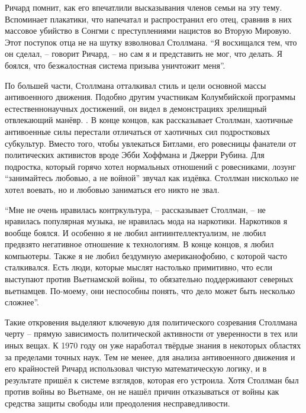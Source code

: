 Ричард помнит, как его впечатлили высказывания членов семьи на эту тему. Вспоминает плакатики, что напечатал и распространил его отец, сравнив в них массовое убийство в Сонгми с преступлениями нацистов во Вторую Мировую. Этот поступок отца не на шутку взволновал Столлмана. \enquote{Я восхищался тем, что он сделал, -- говорит Ричард, -- но сам я и представить не мог, что делать. Я боялся, что безжалостная система призыва уничтожит меня}.

По большей части, Столлмана отталкивал стиль и цели основной массы антивоенного движения. Подобно другим участникам Колумбийской программы естественнонаучных достижений, он видел в демонстрациях зрелищный отвлекающий манёвр. . В конце концов, как рассказывает Столлман, хаотичные антивоенные силы перестали отличаться от хаотичных сил подростковых субкультур. Вместо того, чтобы увлекаться Битлами, его ровесницы фанатели от политических активистов вроде Эбби Хоффмана и Джерри Рубина. Для подростка, который горячо хотел нормальных отношений с ровесниками, лозунг \enquote{занимайтесь любовью, а не войной} звучал как издёвка. Столлман нисколько не хотел воевать, но и любовью заниматься его никто не звал.

\enquote{Мне не очень нравилась контркультура, -- рассказывает Столлман, -- не нравилась популярная музыка, не нравилась мода на наркотики. Наркотиков я вообще боялся. И особенно я не любил антиинтеллектуализм, не любил предвзято негативное отношение к технологиям. В конце концов, я любил компьютеры. Также я не любил бездумную американофобию, с которой часто сталкивался. Есть люди, которые мыслят настолько примитивно, что если выступают против Вьетнамской войны, то обязательно поддерживают северных вьетнамцев. По-моему, они неспособны понять, что дело может быть несколько сложнее}.

Такие откровения выделяют ключевую для политического созревания Столлмана черту -- прямую зависимость политической активности от уверенности в тех или иных вещах. К 1970 году он уже наработал твёрдые знания в некоторых областях за пределами точных наук. Тем не менее, для анализа антивоенного движения и его крайностей Ричард использовал чистую математическую логику, и в результате пришёл к системе взглядов, которая его устроила. Хотя Столлман был против войны во Вьетнаме, он не нашёл причин отказываться от войны как средства защиты свободы или преодоления несправедливости.

